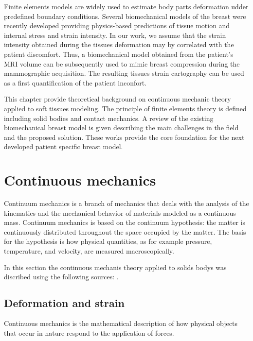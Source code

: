 

Finite elements models are widely used to estimate body parts deformation udder predefined boundary conditions. Several biomechanical models of the breast were recently developed providing physics-based predictions of tissue motion and internal stress and strain intensity.  In our work, we assume that the strain intensity obtained during the tissues deformation may by correlated with the patient discomfort. Thus, a biomechanical model obtained from the patient's MRI volume can be subsequently used to mimic breast compression during the mammographic acquisition. The resulting tissues strain cartography can be used as a first quantification of the patient inconfort.

This chapter provide theoretical background on continuous mechanic theory applied to soft tissues modeling. The principle of finite elements theory is defined including solid bodies and contact mechanics. A review of the existing biomechanical breast model is given describing the main challenges in the field and the proposed solution. These works provide the core foundation for the next developed patient specific breast model. 
      
\clearpage
\section{Continuous mechanics}
\label{section:continuousmechanics}
Continuum mechanics is a branch of mechanics that deals with the analysis of the kinematics and the mechanical behavior of materials modeled as a continuous mass. Continuum mechanics is based on the continuum hypothesis: the matter is continuously distributed throughout the space occupied by the matter. The basis for the hypothesis is how physical quantities, as for example pressure, temperature, and velocity, are measured macroscopically.

In this section the continuous mechanis theory applied to solids bodys was discribed using the following sources: \cite{belytschko_nonlinear_2013,abeyaratne_continuum_2012}.
\subsection{Deformation and strain}\label{subsection:defromationandstrain}
Continuous mechanics is the mathematical description of how physical objects that occur in nature respond to the application of forces.

